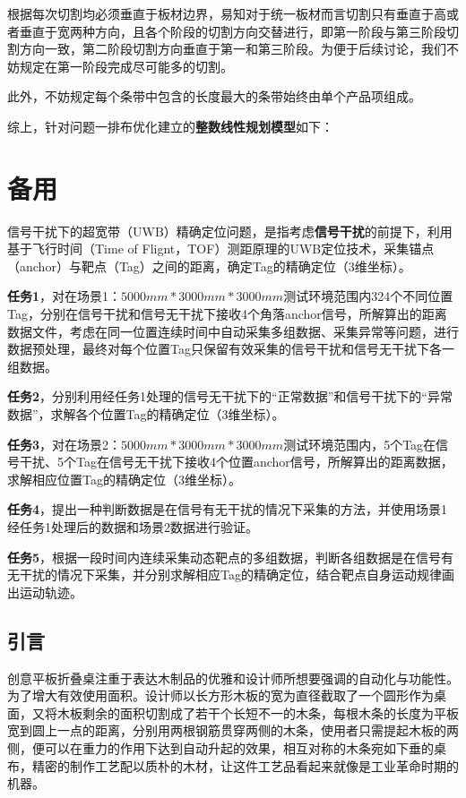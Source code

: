 \documentclass[bwprint]{gmcmthesis}
\begin{document}
根据每次切割均必须垂直于板材边界，易知对于统一板材而言切割只有垂直于高或者垂直于宽两种方向，且各个阶段的切割方向交替进行，即第一阶段与第三阶段切割方向一致，第二阶段切割方向垂直于第一和第三阶段。为便于后续讨论，我们不妨规定在第一阶段完成尽可能多的切割。







此外，不妨规定每个条带中包含的长度最大的条带始终由单个产品项组成。



综上，针对问题一排布优化建立的\textbf{整数线性规划模型}如下：



\section{备用}
信号干扰下的超宽带（UWB）精确定位问题，是指考虑\textbf{信号干扰}的前提下，利用基于飞行时间（Time of Flignt，TOF）测距原理的UWB定位技术，采集锚点（anchor）与靶点（Tag）之间的距离，确定Tag的精确定位（3维坐标）。

\textbf{任务1}，对在场景1：$5000mm*3000mm*3000mm$测试环境范围内324个不同位置Tag，分别在信号干扰和信号无干扰下接收4个角落anchor信号，所解算出的距离数据文件，考虑在同一位置连续时间中自动采集多组数据、采集异常等问题，进行数据预处理，最终对每个位置Tag只保留有效采集的信号干扰和信号无干扰下各一组数据。

\textbf{任务2}，分别利用经任务1处理的信号无干扰下的“正常数据”和信号干扰下的“异常数据”，求解各个位置Tag的精确定位（3维坐标）。

\textbf{任务3}，对在场景2：$5000mm*3000mm*3000mm$测试环境范围内，5个Tag在信号干扰、5个Tag在信号无干扰下接收4个位置anchor信号，所解算出的距离数据，求解相应位置Tag的精确定位（3维坐标）。

\textbf{任务4}，提出一种判断数据是在信号有无干扰的情况下采集的方法，并使用场景1经任务1处理后的数据和场景2数据进行验证。

\textbf{任务5}，根据一段时间内连续采集动态靶点的多组数据，判断各组数据是在信号有无干扰的情况下采集，并分别求解相应Tag的精确定位，结合靶点自身运动规律画出运动轨迹。

\subsection{引言}
创意平板折叠桌注重于表达木制品的优雅和设计师所想要强调的自动化与功能性。为了增大有效使用面积。设计师以长方形木板的宽为直径截取了一个圆形作为桌面，又将木板剩余的面积切割成了若干个长短不一的木条，每根木条的长度为平板宽到圆上一点的距离，分别用两根钢筋贯穿两侧的木条，使用者只需提起木板的两侧，便可以在重力的作用下达到自动升起的效果，相互对称的木条宛如下垂的桌布，精密的制作工艺配以质朴的木材，让这件工艺品看起来就像是工业革命时期的机器。
\end{document}
